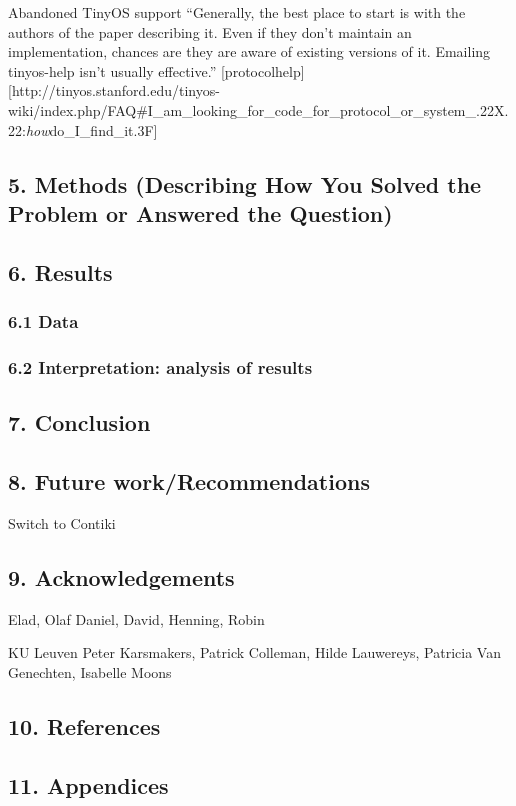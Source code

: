 Abandoned TinyOS support ``Generally, the best place to start is with
the authors of the paper describing it. Even if they don't maintain an
implementation, chances are they are aware of existing versions of it.
Emailing tinyos-help isn't usually effective.''
{[}protocolhelp{]}{[}http://tinyos.stanford.edu/tinyos-wiki/index.php/FAQ\#I\_am\_looking\_for\_code\_for\_protocol\_or\_system\_.22X.22:\emph{how}do\_I\_find\_it.3F{]}

\subsection{5. Methods (Describing How You Solved the Problem or
Answered the
Question)}\label{methods-describing-how-you-solved-the-problem-or-answered-the-question}

\subsection{6. Results}\label{results}

\subsubsection{6.1 Data}\label{data}

\subsubsection{6.2 Interpretation: analysis of
results}\label{interpretation-analysis-of-results}

\subsection{7. Conclusion}\label{conclusion}

\subsection{8. Future
work/Recommendations}\label{future-workrecommendations}

Switch to Contiki

\subsection{9. Acknowledgements}\label{acknowledgements}

Elad, Olaf Daniel, David, Henning, Robin

KU Leuven Peter Karsmakers, Patrick Colleman, Hilde Lauwereys, Patricia
Van Genechten, Isabelle Moons

\subsection{10. References}\label{references}

\subsection{11. Appendices}\label{appendices}
